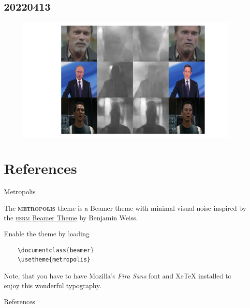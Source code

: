 \documentclass[10pt]{beamer}
\newcommand{\themename}{\textbf{\textsc{metropolis}}\xspace}
\begin{document}
\subsection{20220413}
\begin{frame}
  \begin{figure}
    \includegraphics[width=1\linewidth]{figure/20220413/deepfake_mde.pdf}
    \label{}
    \caption{}
  \end{figure}
\end{frame}

\section{References}

\begin{frame}[fragile]{Metropolis}

  The \themename theme is a Beamer theme with minimal visual noise
  inspired by the \href{https://github.com/hsrmbeamertheme/hsrmbeamertheme}{\textsc{hsrm} Beamer
  Theme} by Benjamin Weiss.

  Enable the theme by loading

  \begin{verbatim}    \documentclass{beamer}
    \usetheme{metropolis}\end{verbatim}

  Note, that you have to have Mozilla's \emph{Fira Sans} font and XeTeX
  installed to enjoy this wonderful typography.
\end{frame}

\begin{frame}[allowframebreaks]{References}

  
  

\end{frame}
\end{document}
